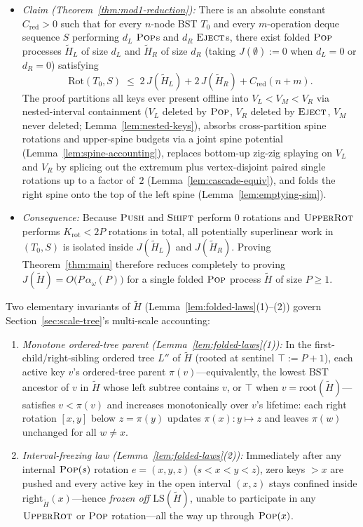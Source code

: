 \documentclass[11pt]{article}
\theoremstyle{definition}
\theoremstyle{remark}
\newcommand{\LS}{\mathrm{LS}}
\newcommand{\Rot}{\mathrm{Rot}}
\newcommand{\PUSH}{\textnormal{\scshape Push}}
\newcommand{\POP}{\textnormal{\scshape Pop}}
\newcommand{\EJECT}{\textnormal{\scshape Eject}}
\newcommand{\SHIFT}{\textnormal{\scshape Shift}}
\newcommand{\UPROT}{\textnormal{\scshape UpperRot}}
\begin{document}
\begin{itemize}[leftmargin=2em, itemsep=2pt]
  \item \emph{Claim (Theorem~\ref{thm:mod1-reduction}):} There is an absolute constant $C_{\mathrm{red}} > 0$ such that for every $n$-node BST $T_0$ and every $m$-operation deque sequence $S$ performing $d_L$ $\POP$s and $d_R$ $\EJECT$s, there exist folded $\POP$ processes $\widetilde{H}_L$ of size $d_L$ and $\widetilde{H}_R$ of size $d_R$ (taking $J(\emptyset) := 0$ when $d_L = 0$ or $d_R = 0$) satisfying
  \[
  \Rot(T_0, S) \;\le\; 2\,J(\widetilde{H}_L) + 2\,J(\widetilde{H}_R) + C_{\mathrm{red}}(n + m).
  \]
  The proof partitions all keys ever present offline into $V_L < V_M < V_R$ via nested-interval containment ($V_L$ deleted by $\POP$, $V_R$ deleted by $\EJECT$, $V_M$ never deleted; Lemma~\ref{lem:nested-keys}), absorbs cross-partition spine rotations and upper-spine budgets via a joint spine potential (Lemma~\ref{lem:spine-accounting}), replaces bottom-up zig-zig splaying on $V_L$ and $V_R$ by splicing out the extremum plus vertex-disjoint paired single rotations up to a factor of~$2$ (Lemma~\ref{lem:cascade-equiv}), and folds the right spine onto the top of the left spine (Lemma~\ref{lem:emptying-sim}).
  \item \emph{Consequence:} Because $\PUSH$ and $\SHIFT$ perform $0$ rotations and $\UPROT$ performs $K_{\mathrm{rot}} < 2P$ rotations in total, all potentially superlinear work in $(T_0, S)$ is isolated inside $J(\widetilde{H}_L)$ and $J(\widetilde{H}_R)$. Proving Theorem~\ref{thm:main} therefore reduces completely to proving $J(\widetilde{H}) = O\big(P\,\alpha_\omega(P)\big)$ for a single folded $\POP$ process $\widetilde{H}$ of size $P \ge 1$.
\end{itemize}
Two elementary invariants of $\widetilde{H}$ (Lemma~\ref{lem:folded-laws}(1)--(2)) govern Section~\ref{sec:scale-tree}'s multi-scale accounting:
\begin{enumerate}[label=(\roman*), leftmargin=2em, itemsep=1pt]
  \item \emph{Monotone ordered-tree parent (Lemma~\ref{lem:folded-laws}(1)):} In the first-child/right-sibling ordered tree $L''$ of $\widetilde{H}$ (rooted at sentinel $\top := P + 1$), each active key $v$'s ordered-tree parent $\pi(v)$---equivalently, the lowest BST ancestor of $v$ in $\widetilde{H}$ whose left subtree contains $v$, or $\top$ when $v = \mathrm{root}(\widetilde{H})$---satisfies $v < \pi(v)$ and increases monotonically over $v$'s lifetime: each right rotation $[x, y]$ below $z = \pi(y)$ updates $\pi(x) : y \mapsto z$ and leaves $\pi(w)$ unchanged for all $w \ne x$.
  \item \emph{Interval-freezing law (Lemma~\ref{lem:folded-laws}(2)):} Immediately after any internal $\POP(s)$ rotation $e = (x, y, z)$ ($s < x < y < z$), zero keys $> x$ are pushed and every active key in the open interval $(x, z)$ stays confined inside $\mathrm{right}_{\widetilde{H}}(x)$---hence \emph{frozen off $\LS(\widetilde{H})$}, unable to participate in any $\UPROT$ or $\POP$ rotation---all the way up through $\POP(x)$.
\end{enumerate}
\end{document}
